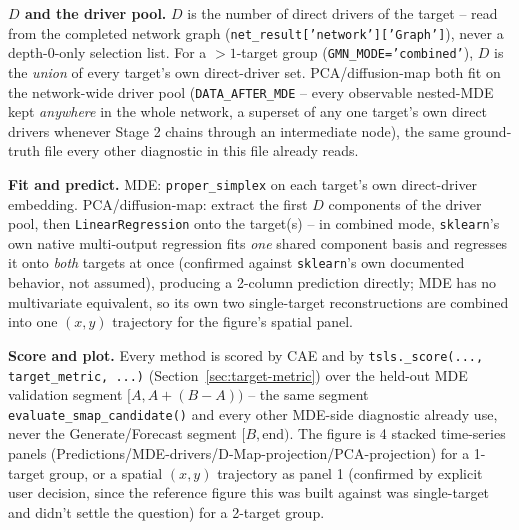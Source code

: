 \documentclass[11pt]{article}
\begin{document}
\begin{steps}
\item \textbf{$D$ and the driver pool.} $D$ is the number of direct drivers of the target -- read from the completed network graph (\texttt{net\_result['network']['Graph']}), never a depth-0-only selection list. For a $>1$-target group (\texttt{GMN\_MODE='combined'}), $D$ is the \emph{union} of every target's own direct-driver set. PCA/diffusion-map both fit on the network-wide driver pool (\texttt{DATA\_AFTER\_MDE} -- every observable nested-MDE kept \emph{anywhere} in the whole network, a superset of any one target's own direct drivers whenever Stage 2 chains through an intermediate node), the same ground-truth file every other diagnostic in this file already reads.
\item \textbf{Fit and predict.} MDE: \texttt{proper\_simplex} on each target's own direct-driver embedding. PCA/diffusion-map: extract the first $D$ components of the driver pool, then \texttt{LinearRegression} onto the target(s) -- in combined mode, \texttt{sklearn}'s own native multi-output regression fits \emph{one} shared component basis and regresses it onto \emph{both} targets at once (confirmed against \texttt{sklearn}'s own documented behavior, not assumed), producing a 2-column prediction directly; MDE has no multivariate equivalent, so its own two single-target reconstructions are combined into one $(x,y)$ trajectory for the figure's spatial panel.
\item \textbf{Score and plot.} Every method is scored by CAE and by \texttt{tsls.\_score(..., target\_metric, ...)} (Section~\ref{sec:target-metric}) over the held-out MDE validation segment $[A, A{+}(B{-}A))$ -- the same segment \texttt{evaluate\_smap\_candidate()} and every other MDE-side diagnostic already use, never the Generate/Forecast segment $[B,\mathrm{end})$. The figure is 4 stacked time-series panels (Predictions/MDE-drivers/D-Map-projection/PCA-projection) for a 1-target group, or a spatial $(x,y)$ trajectory as panel 1 (confirmed by explicit user decision, since the reference figure this was built against was single-target and didn't settle the question) for a 2-target group.
\end{steps}
\end{document}
